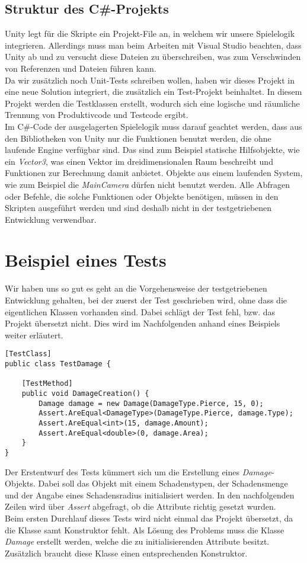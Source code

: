 \subsection{Struktur des C\#-Projekts}
Unity legt für die Skripte ein Projekt-File an, in welchem wir unsere Spielelogik integrieren. Allerdings muss man beim Arbeiten mit Visual Studio beachten, dass Unity ab und zu versucht diese Dateien zu überschreiben, was zum Verschwinden von Referenzen und Dateien führen kann.\\
Da wir zusätzlich noch Unit-Tests schreiben wollen, haben wir dieses Projekt in eine neue Solution integriert, die zusätzlich ein Test-Projekt beinhaltet. In diesem Projekt werden die Testklassen erstellt, wodurch sich eine logische und räumliche Trennung von Produktivcode und Testcode ergibt.\\
Im C\#-Code der ausgelagerten Spielelogik muss darauf geachtet werden, dass aus den Bibliotheken von Unity nur die Funktionen benutzt werden, die ohne laufende Engine verfügbar sind. Das sind zum Beispiel statische Hilfsobjekte, wie ein \textit{Vector3}, was einen Vektor im dreidimensionalen Raum beschreibt und Funktionen zur Berechnung damit anbietet. Objekte aus einem laufenden System, wie zum Beispiel die \textit{MainCamera} dürfen nicht benutzt werden. Alle Abfragen oder Befehle, die solche Funktionen oder Objekte benötigen, müssen in den Skripten ausgeführt werden und sind deshalb nicht in der testgetriebenen Entwicklung verwendbar. 

\section{Beispiel eines Tests}
Wir haben uns so gut es geht an die Vorgehensweise der testgetriebenen Entwicklung gehalten, bei der zuerst der Test geschrieben wird, ohne dass die eigentlichen Klassen vorhanden sind. Dabei schlägt der Test fehl, bzw. das Projekt übersetzt nicht. Dies wird im Nachfolgenden anhand eines Beispiels weiter erläutert.\\

\begin{lstlisting}[caption={[Erster Test der Klasse Damage]Erster Test der Klasse Damage}]
[TestClass]
public class TestDamage {

	[TestMethod]
	public void DamageCreation() {
		Damage damage = new Damage(DamageType.Pierce, 15, 0);
		Assert.AreEqual<DamageType>(DamageType.Pierce, damage.Type);
		Assert.AreEqual<int>(15, damage.Amount);
		Assert.AreEqual<double>(0, damage.Area);
	}
}
\end{lstlisting}
Der Erstentwurf des Tests kümmert sich um die Erstellung eines \textit{Damage}-Objekts. Dabei soll das Objekt mit einem Schadenstypen, der Schadensmenge und der Angabe eines Schadensradius initialisiert werden. In den nachfolgenden Zeilen wird über \textit{Assert} abgefragt, ob die Attribute richtig gesetzt wurden.\\
Beim ersten Durchlauf dieses Tests wird nicht einmal das Projekt übersetzt, da die Klasse samt Konstruktor fehlt. Als Lösung des Problems muss die Klasse \textit{Damage} erstellt werden, welche die zu initialisierenden Attribute besitzt. Zusätzlich braucht diese Klasse einen entsprechenden Konstruktor.


